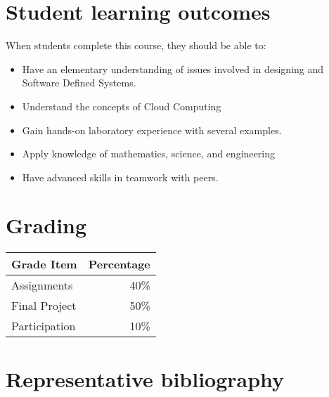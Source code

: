 \section{Student learning outcomes}

When students complete this course, they should be able to:

\begin{itemize}
\item Have an elementary understanding of issues involved in designing
  and Software Defined Systems.
\item Understand the concepts of Cloud Computing
\item Gain hands-on laboratory experience with several examples.
\item Apply knowledge of mathematics, science, and engineering
\item	Have advanced skills in teamwork with peers.
\end{itemize}

\section{Grading}

\begin{tabular}{lr}
Grade Item	  & Percentage\\
\hline
Assignments	  & 40\% \\
Final Project	& 50\% \\
Participation	& 10\% \\
\hline
\end{tabular}




\section{Representative bibliography}

